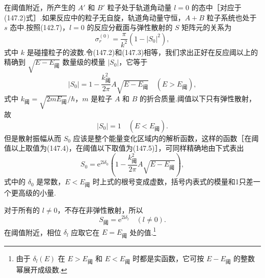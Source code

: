 在阈值附近，所产生的 $A'$ 和 $B'$ 粒子处于轨道角动量 $l=0$ 的态中［对应于(147.2)式］.如果反应中的粒子无自旋，轨道角动量守恒，$A+B$ 粒子系统也处于 $s$ 态中.按照(142.7)，$l=0$ 的反应分截面与弹性散射的 $S$ 矩阵元的关系为
\begin{equation}
  \sigma_r^{(0)}=\frac{\pi}{k^2}\left(1-|S_0|^2\right),
\end{equation}
式中 $k$ 是碰撞粒子的波数.令(147.2)和(147.3)相等，我们求出正好在反应阈以上的精确到 $\sqrt{E-E_{\text{阈}}}$ 数量级的模量 $|S_0|$，它等于
\begin{equation}
  |S_0|=1-\frac{k_{\text{阈}}^2}{2\pi}A\sqrt{E-E_{\text{阈}}}
  \quad\left(E>E_{\text{阈}}\right),
\end{equation}
式中 $k_{\text{阈}}=\sqrt{2mE_{\text{阈}}}/\hbar$，$m$ 是粒子 $A$ 和 $B$ 的折合质量.阈值以下只有弹性散射，故
\begin{equation}
  |S_0|=1\quad\left(E<E_{\text{阈}}\right).
\end{equation}
但是散射振幅从而 $S_0$ 应该是整个能量变化区域内的解析函数，这样的函数［在阈值以上取值为(147.4)，在阈值以下取值为(147.5)］，可同样精确地由下式表出
\begin{equation}
  S_0=\mathrm{e}^{2\mathrm{i}\delta_0}
  \left(1-\frac{k_{\text{阈}}^2}{2\pi}A\sqrt{E-E_{\text{阈}}}\right),
\end{equation}
式中的 $\delta_0$ 是常数，$E<E_{\text{阈}}$ 时上式的根号变成虚数，括号内表式的模量和1只差一个更高级的小量.

对于所有的 $l\neq0$，不存在非弹性散射，所以
\begin{equation}
  S_{\text{阈}}=\mathrm{e}^{2\mathrm{i}\delta_l}\quad(l\neq0).
\end{equation}
在阈值附近，相位 $\delta_l$ 应取它在 $E=E_{\text{阈}}$ 处的值.\footnote{由于 $\delta_l(E)$ 在 $E>E_{\text{阈}}$ 和 $E<E_{\text{阈}}$ 时都是实函数，它可按 $E-E_{\text{阈}}$ 的整数幂展开成级数.}

